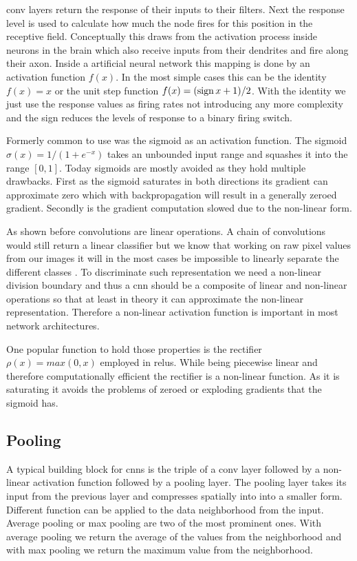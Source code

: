 \gls{conv} layers return the response of their inputs to their filters. Next the response level is used to calculate how much the node fires for this position in the receptive field. Conceptually this draws from the activation process inside neurons in the brain which also receive inputs from their dendrites and fire along their axon. Inside a artificial neural network this mapping is done by an activation function $f(x)$. In the most simple cases this can be the identity $f(x) = x$ or the unit step function $f(x) = (\operatorname{sign} x + 1) / 2$. With the identity we just use the response values as firing rates not introducing any more complexity and the sign reduces the levels of response to a binary firing switch.

Formerly common to use was the sigmoid as an activation function. The sigmoid $\sigma(x) = 1/(1+e^{-x})$  takes an unbounded input range and squashes it into the range $[0, 1]$. Today sigmoids are mostly avoided as they hold multiple drawbacks. First as the sigmoid saturates in both directions its gradient can approximate zero which with backpropagation will result in a generally zeroed gradient. Secondly is the gradient computation slowed due to the non-linear form.

As shown before convolutions are linear operations. A chain of convolutions would still return a linear classifier but we know that working on raw pixel values from our images it will in the most cases be impossible to linearly separate the different classes \citep{lecun_deep_2015}. To discriminate such representation we need a non-linear division boundary and thus a \gls{cnn} should be a composite of linear and non-linear operations so that at least in theory it can approximate the non-linear representation. Therefore a non-linear activation function is important in most network architectures.

One popular function to hold those properties is the rectifier $\rho(x) = max(0, x)$  employed in \glspl{relu}. While being piecewise linear and therefore computationally efficient the rectifier is a non-linear function. As it is saturating it avoids the problems of zeroed or exploding gradients that the sigmoid has.

\subsection{Pooling}
\label{sub:concepts:nn:pooling}
A typical building block for \glspl{cnn} is the triple of a \gls{conv} layer followed by a non-linear activation function followed by a pooling layer. The pooling layer takes its input from the previous layer and compresses spatially into into a smaller form. Different function can be applied to the data neighborhood from the input. Average pooling \citep{lecun_handwritten_1990} or max pooling \citep{zhou_computation_1988} are two of the most prominent ones. With average pooling we return the average of the values from the neighborhood and with max pooling we return the maximum value from the neighborhood.

